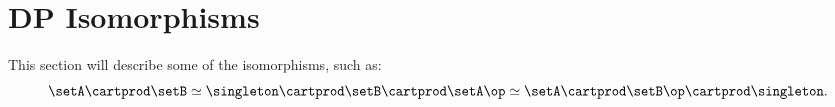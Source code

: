
\section{DP Isomorphisms}

\begin{publictodo}
	This section will describe some of the isomorphisms, such as:
	\begin{equation}
		\setA \cartprod \setB \simeq \singleton \cartprod \setB \cartprod \setA \op \simeq \setA \cartprod \setB\op \cartprod \singleton.
	\end{equation}
\end{publictodo}

